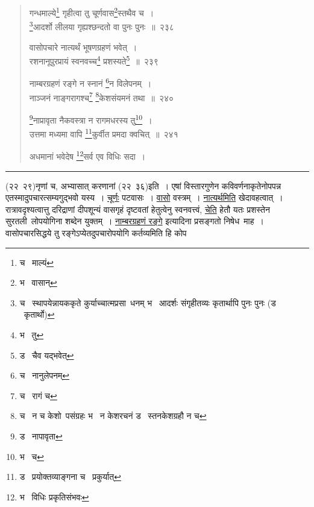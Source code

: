 \documentclass[11pt, openany]{book}
\begin{document}
\begin{quote}
{\na गन्धमाल्ये\renewcommand{\thefootnote}{1}\footnote{च \textendash\  माल्यं} गृहीत्वा तु चूर्णवास\renewcommand{\thefootnote}{2}\footnote{भ \textendash\  वासान्}स्तथैव च~।\\
\renewcommand{\thefootnote}{3}\footnote{च \textendash\  स्थापयेन्नायककृते कुर्याच्चात्मप्रसा\textendash\ धनम् भ \textendash\  आदर्शः संगृहीतव्यः कृतार्थापि पुनः पुनः (ड \textendash\  कृतार्थो)}आदर्शो लीलया गृह्यश्छन्दतो वा पुनः पुनः~॥~२३८

वासोपचारे नात्यर्थं भूषणग्रहणं भवेत्~।\\
रशनानूपुरप्रायं स्वनवच्च\renewcommand{\thefootnote}{4}\footnote{भ \textendash\  तु} प्रशस्यते\renewcommand{\thefootnote}{5}\footnote{ड \textendash\  चैव यद्भवेत्}~॥~२३९

नाम्बरग्रहणं रङ्गे न स्नानं \renewcommand{\thefootnote}{6}\footnote{च \textendash\  नानुलेपनम्}न विलेपनम्~।\\
नाञ्जनं नाङ्गरागश्च\renewcommand{\thefootnote}{7}\footnote{च \textendash\  रागं च} \renewcommand{\thefootnote}{8}\footnote{च \textendash\  न च केशो\textendash\ पसंग्रहः भ \textendash\  न केशरचनं ड \textendash\  स्तनकेशग्रहौ न च}केशसंयमनं तथा~॥~२४०

\renewcommand{\thefootnote}{9}\footnote{ड \textendash\  नापावृता}नाप्रावृता नैकवस्त्रा न रागमधरस्य तु\renewcommand{\thefootnote}{10}\footnote{भ \textendash\  च}~।\\
उत्तमा मध्यमा वापि \renewcommand{\thefootnote}{11}\footnote{ड \textendash\  प्रयोक्तव्याङ्गना च \textendash\  प्रकुर्यात्}कुर्वीत प्रमदा क्वचित्~॥~२४१

अधमानां भवेदेष \renewcommand{\thefootnote}{12}\footnote{भ \textendash\  विधिः प्रकृतिसंभवः}सर्व एव विधिः सदा~।}
\end{quote}

\hrule

\vspace{2mm}
\noindent
(२२\textendash\ २९)नृणां च, {\qt अभ्यासात् करणानां} (२२\textendash\ ३६)इति~। एषां विस्तारगुणेन कविवर्णनाकृतेनोपपन्न एतस्मादुपचारत्सम्यगुद्भवो यस्य~। \underline{चूर्णः} पटवासः~। \underline{वासो} वस्त्रम्~। \underline{नात्यर्थमिति} खेदावहत्वात्~। रात्रावदृश्यत्वात्तु दरिद्राणां दीपशून्यं वासगृहं दृष्टवतां हेतुत्वेनु स्वनवत्त्वं, \underline{चेति} हेतौ यतः प्रशस्तेन सुरतली\textendash\ लोपयोगिना शब्देन युक्तम्~। \underline{नाम्बरग्रहणं रङ्गे} इत्यादिना प्रसङ्गतो निषेध\textendash\ माह~। वासोपचारसिद्धये तु रङ्गेऽप्येतदुपचारोपयोगि कर्तव्यमिति हि कोप\textendash

\newpage
\end{document}
